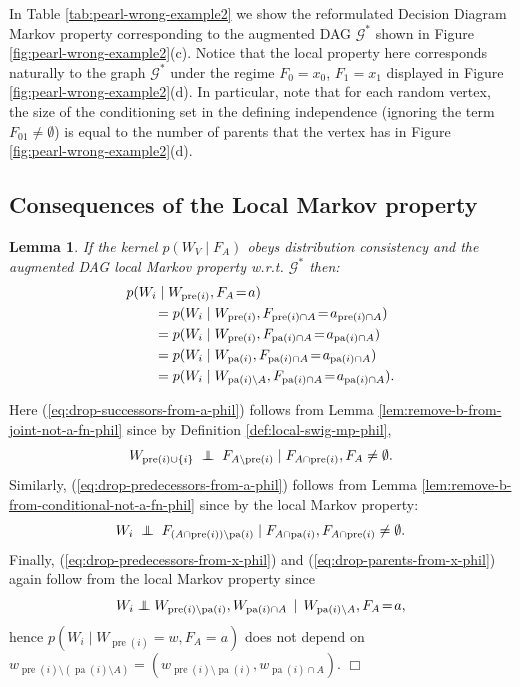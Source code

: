 \documentclass[11pt]{article}
\DeclareMathOperator{\pa}{pa}
\DeclareMathOperator{\pre}{pre}
\newtheorem{lemma}[theorem]{Lemma}
\newcommand{\G}{{\mathscr G}}
\newcommand\indep{\protect\mathpalette{\protect\independenT}{\perp}}
\def\independenT#1#2{\mathrel{\rlap{$#1#2$}\mkern2.5mu{#1#2}}}
\begin{document}
{In Table \ref{tab:pearl-wrong-example2} we show the reformulated Decision Diagram Markov property corresponding to the augmented DAG $\G^*$ shown in Figure \ref{fig:pearl-wrong-example2}(c). Notice that the local property here corresponds naturally to the graph $\G^*$ under the regime $F_0=x_0$, $F_1=x_1$ displayed in Figure \ref{fig:pearl-wrong-example2}(d).
In particular, note that for each random vertex, the size of the conditioning set in the defining independence (ignoring the term $F_{01}\neq \emptyset$) is equal to the number  of parents that the vertex has in Figure \ref{fig:pearl-wrong-example2}(d).

\subsection{Consequences of the Local Markov property}

\begin{lemma}\label{lem:kernel-of-swig-lmp-phil}
If the kernel $p(W_V \mid F_A)$ obeys distribution consistency and the augmented DAG local Markov property w.r.t. $\G^*$ then:
\begin{align}
\MoveEqLeft{p(W_i \mid W_{\pre(i)}, F_A\!=\!a )}\label{eq:swig-lmp-lhs-phil}\\
&= p(W_i \mid W_{\pre(i)}, F_{\pre(i)\cap A}\!=\!a_{\pre(i)\cap A} ) \label{eq:drop-successors-from-a-phil}  \\
&= p(W_i \mid W_{\pre(i)}, F_{\pa(i)\cap A}\!=\!a_{\pa(i)\cap A} )\label{eq:drop-predecessors-from-a-phil} \\
&= p(W_i \mid W_{\pa(i)}, F_{\pa(i)\cap A}\!=\!a_{\pa(i)\cap A} )\label{eq:drop-predecessors-from-x-phil} \\
&= p(W_i \mid W_{\pa(i)\setminus A}, F_{\pa(i)\cap A}\!=\!a_{\pa(i)\cap A} ). \label{eq:drop-parents-from-x-phil} 
\end{align}
\end{lemma}


Here (\ref{eq:drop-successors-from-a-phil}) follows from Lemma \ref{lem:remove-b-from-joint-not-a-fn-phil} since by Definition
\ref{def:local-swig-mp-phil}, 
\[
W_{\pre(i)\cup \{i\}} \;\indep\; F_{A\setminus \pre(i)} \mid F_{A\cap \pre(i)}, F_A\neq \emptyset.
\]
Similarly, (\ref{eq:drop-predecessors-from-a-phil}) follows from Lemma \ref{lem:remove-b-from-conditional-not-a-fn-phil} since by the local Markov property:
\[
W_{i} \;\indep\; F_{(A\cap \pre(i))\setminus \pa(i)} \mid F_{A\cap \pa(i)}, F_{A\cap \pre(i)}\neq \emptyset.
\]
Finally, (\ref{eq:drop-predecessors-from-x-phil}) and (\ref{eq:drop-parents-from-x-phil}) again follow from the local Markov property
since 
\[
W_i \indep W_{\pre(i)\setminus \pa(i)}, W_{\pa(i)\cap A} \,\mid\,  W_{\pa(i)\setminus A}, F_A\!=\!a,
\]
hence $p(W_i \mid W_{\pre(i)}\!=\!w, F_A\!=\!a )$  does not depend on $w_{\pre(i)\setminus (\pa(i) \setminus A)} = 
(w_{\pre(i)\setminus \pa(i)}, w_{\pa(i)\cap A})$.  \hfill$\Box$\par


}
\end{document}
